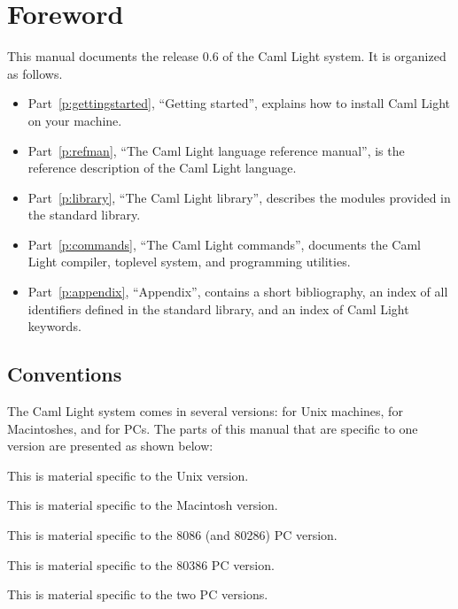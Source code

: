 \chapter*{Foreword}

This manual documents the release 0.6 of the Caml Light system. It is
organized as follows.
\begin{itemize}
\item Part~\ref{p:gettingstarted}, ``Getting started'', explains how
to install Caml Light on your machine.
\item Part~\ref{p:refman}, ``The Caml Light language reference
manual'', is the reference description of the Caml Light language.
\item Part~\ref{p:library}, ``The Caml Light library'', describes the
modules provided in the standard library.
\item Part~\ref{p:commands}, ``The Caml Light commands'', documents
the Caml Light compiler, toplevel system, and programming utilities.
\item Part~\ref{p:appendix}, ``Appendix'', contains a short bibliography, an
index of all identifiers defined in the standard library, and an
index of Caml Light keywords.
\end{itemize}

\section*{Conventions}

The Caml Light system comes in several versions: for Unix machines,
for Macintoshes, and for PCs. The parts of this manual that are
specific to one version are presented as shown below:

\begin{unix} This is material specific to the Unix version.
\end{unix}

\begin{mac} This is material specific to the Macintosh version.
\end{mac}

\begin{pcbase} This is material specific to the 8086 (and 80286) PC version.
\end{pcbase}

\begin{pcthree} This is material specific to the 80386 PC version.
\end{pcthree}

\begin{pc} This is material specific to the two PC versions.
\end{pc}

